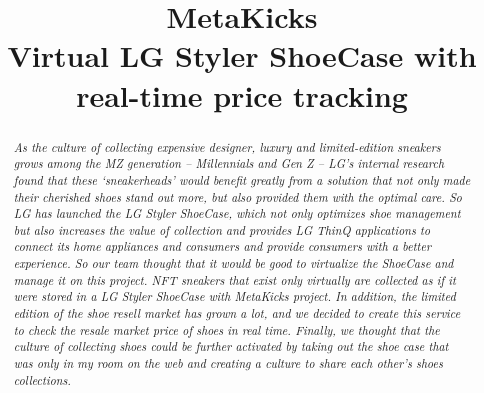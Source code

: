 \documentclass[conference]{IEEEtran}
\begin{document}
\title{MetaKicks\\{\Large
 Virtual LG Styler ShoeCase with real-time price tracking 
 }
}

\author{
\and
{}
\and
{}
\and
{}
}

\maketitle

\begin{abstract}
\textit{As the culture of collecting expensive designer, luxury and limited-edition sneakers grows among the MZ generation – Millennials and Gen Z – LG’s internal research found that these ‘sneakerheads’ would benefit greatly from a solution that not only made their cherished shoes stand out more, but also provided them with the optimal care. So LG has launched the LG Styler ShoeCase, which not only optimizes shoe management but also increases the value of collection and provides LG ThinQ applications to connect its home appliances and consumers and provide consumers with a better experience. So our team thought that it would be good to virtualize the ShoeCase and manage it on this project. NFT sneakers that exist only virtually are collected as if it were stored in a LG Styler ShoeCase with MetaKicks project. In addition, the limited edition of the shoe resell market has grown a lot, and we decided to create this service to check the resale market price of shoes in real time. Finally, we thought that the culture of collecting shoes could be further activated by taking out the shoe case that was only in my room on the web and creating a culture to share each other's shoes collections.}\end{abstract}
\end{document}
